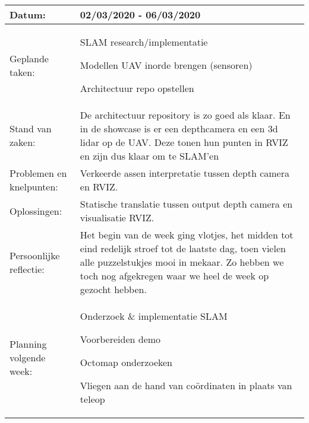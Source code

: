 \begin{tabularx}{\textwidth}{| l | X |}
  \hline
  Datum: & 02/03/2020 - 06/03/2020\\
  \hline
  Geplande taken: &
  \begin{compactitem}
    \item SLAM research/implementatie
    \item Modellen UAV inorde brengen (sensoren)
    \item Architectuur repo opstellen
  \end{compactitem}\\
  \hline
  Stand van zaken: & De architectuur repository is zo goed als klaar. En in de showcase is er een depthcamera en een 3d lidar op de UAV. Deze tonen hun punten in RVIZ en zijn dus klaar om te SLAM'en\\
  \hline
  Problemen en knelpunten: & Verkeerde assen interpretatie tussen depth camera en RVIZ.\\
  \hline
  Oplossingen: & Statische translatie tussen output depth camera en visualisatie RVIZ.\\
  \hline
  Persoonlijke reflectie: & Het begin van de week ging vlotjes, het midden tot eind redelijk stroef tot de laatste dag, toen vielen alle puzzelstukjes mooi in mekaar. Zo hebben we toch nog afgekregen waar we heel de week op gezocht hebben.\\
  \hline
  Planning volgende week: &
  \begin{compactitem}
    \item Onderzoek \& implementatie SLAM
    \item Voorbereiden demo
    \item Octomap onderzoeken
    \item Vliegen aan de hand van co\"ordinaten in plaats van teleop
  \end{compactitem}\\
  \hline
\end{tabularx}